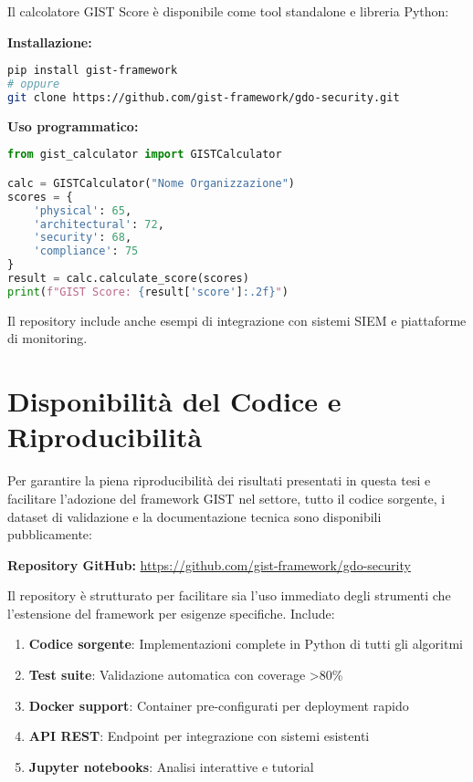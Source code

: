 \begin{tcolorbox}[colback=red!5!white,colframe=red!75!black,title=GIST Calculator - Implementazione Completa]
Il calcolatore GIST Score è disponibile come tool standalone e libreria Python:

\textbf{Installazione:}
\begin{lstlisting}[language=bash, basicstyle=\footnotesize\ttfamily]
pip install gist-framework
# oppure
git clone https://github.com/gist-framework/gdo-security.git
\end{lstlisting}

\textbf{Uso programmatico:}
\begin{lstlisting}[language=python, basicstyle=\footnotesize\ttfamily]
from gist_calculator import GISTCalculator

calc = GISTCalculator("Nome Organizzazione")
scores = {
    'physical': 65,
    'architectural': 72,
    'security': 68,
    'compliance': 75
}
result = calc.calculate_score(scores)
print(f"GIST Score: {result['score']:.2f}")
\end{lstlisting}

Il repository include anche esempi di integrazione con sistemi SIEM e piattaforme di monitoring.
\end{tcolorbox}

\section*{Disponibilità del Codice e Riproducibilità}

Per garantire la piena riproducibilità dei risultati presentati in questa tesi e facilitare l'adozione del framework GIST nel settore, tutto il codice sorgente, i dataset di validazione e la documentazione tecnica sono disponibili pubblicamente:

\begin{center}
\Large
\textbf{Repository GitHub:} \url{https://github.com/gist-framework/gdo-security}
\end{center}

Il repository è strutturato per facilitare sia l'uso immediato degli strumenti che l'estensione del framework per esigenze specifiche. Include:

\begin{enumerate}
    \item \textbf{Codice sorgente}: Implementazioni complete in Python di tutti gli algoritmi
    \item \textbf{Test suite}: Validazione automatica con coverage >80\%
    \item \textbf{Docker support}: Container pre-configurati per deployment rapido
    \item \textbf{API REST}: Endpoint per integrazione con sistemi esistenti
    \item \textbf{Jupyter notebooks}: Analisi interattive e tutorial
\end{enumerate}

